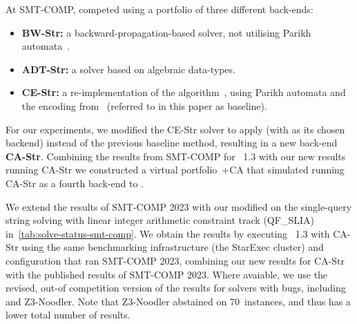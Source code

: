  At SMT-COMP, \Ostrich{} competed using a portfolio of three different
 back-ends:
\begin{itemize}
\item \textbf{BW-Str:} a backward-propagation-based solver, not utilising
  Parikh automata~\cite{ostrich}.
\item \textbf{ADT-Str:} a solver based on algebraic data-types.
\item \textbf{CE-Str:} a re-implementation of the \OstrichPlus{}
  algorithm~\cite{ostrich-plus}, using Parikh automata and the
  encoding from~\cite{generate-parikh-image} (referred to in this paper as baseline).
\end{itemize}

For our experiments, we modified the CE-Str solver to apply \Catra{}
 (with \Calculus{} as its chosen backend)
instead of the previous baseline method, resulting in a new back-end
\textbf{CA-Str}. Combining the results from SMT-COMP for \Ostrich{}~1.3 
with our new results running CA-Str we constructed a virtual 
portfolio~\Ostrich{}+CA that simulated running CA-Str as a fourth
back-end to \Ostrich{}.

%
%

We extend the results of SMT-COMP 2023 with our modified \Ostrich{}
on the single-query string solving with linear integer arithmetic constraint
track (QF\_SLIA) in~\cref{tab:solve-status-smt-comp}. We obtain
the results by executing \Ostrich{}~1.3 with CA-Str using
the same benchmarking infrastructure (the StarExec cluster)
and configuration that ran SMT-COMP 2023, combining our new results for CA-Str with the
published results of SMT-COMP 2023. Where avaiable, we use the revised, out-of
competition version of the results for solvers with bugs, including \Ostrich{} and Z3-Noodler.
Note that Z3-Noodler abstained on 70~instances, and thus has a lower total number of results.

